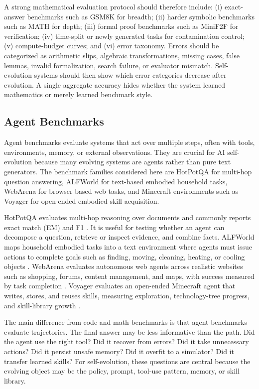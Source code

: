 A strong mathematical evaluation protocol should therefore include: (i) exact-answer benchmarks such as GSM8K for breadth; (ii) harder symbolic benchmarks such as MATH for depth; (iii) formal proof benchmarks such as MiniF2F for verification; (iv) time-split or newly generated tasks for contamination control; (v) compute-budget curves; and (vi) error taxonomy. Errors should be categorized as arithmetic slips, algebraic transformations, missing cases, false lemmas, invalid formalization, search failure, or evaluator mismatch. Self-evolution systems should then show which error categories decrease after evolution. A single aggregate accuracy hides whether the system learned mathematics or merely learned benchmark style.

\subsection{Agent Benchmarks}
\label{subsec:agent-benchmarks}

Agent benchmarks evaluate systems that act over multiple steps, often with tools, environments, memory, or external observations. They are crucial for AI self-evolution because many evolving systems are agents rather than pure text generators. The benchmark families considered here are HotPotQA for multi-hop question answering, ALFWorld for text-based embodied household tasks, WebArena for browser-based web tasks, and Minecraft environments such as Voyager for open-ended embodied skill acquisition.

HotPotQA evaluates multi-hop reasoning over documents and commonly reports exact match (EM) and F1 \cite{hotpotqa2018}. It is useful for testing whether an agent can decompose a question, retrieve or inspect evidence, and combine facts. ALFWorld maps household embodied tasks into a text environment where agents must issue actions to complete goals such as finding, moving, cleaning, heating, or cooling objects \cite{alfworld2020}. WebArena evaluates autonomous web agents across realistic websites such as shopping, forums, content management, and maps, with success measured by task completion \cite{webarena2023}. Voyager evaluates an open-ended Minecraft agent that writes, stores, and reuses skills, measuring exploration, technology-tree progress, and skill-library growth \cite{voyager2023}.

The main difference from code and math benchmarks is that agent benchmarks evaluate trajectories. The final answer may be less informative than the path. Did the agent use the right tool? Did it recover from errors? Did it take unnecessary actions? Did it persist unsafe memory? Did it overfit to a simulator? Did it transfer learned skills? For self-evolution, these questions are central because the evolving object may be the policy, prompt, tool-use pattern, memory, or skill library.


